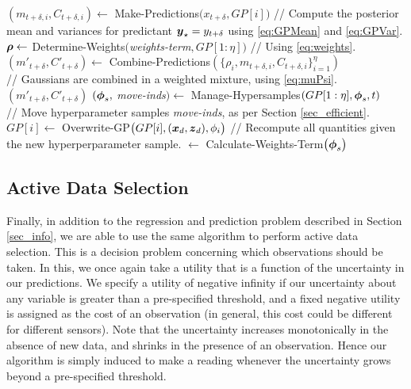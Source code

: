 \documentclass{acmsmall}
\newcommand{\cmmnt}{// }
\begin{document}
\begin{algorithm}[htp]
\begin{algorithmic}[1]
\STATE $(m_{t+\delta,i},C_{t+\delta,i}) \leftarrow$ {\sc Make-Predictions}$\bigl(x_{t+\delta},GP[i]\bigr)$ \cmmnt Compute the posterior mean and variances for predictant $\boldsymbol{y}_\star = y_{t+\delta}$ using \eqref{eq:GPMean} and \eqref{eq:GPVar}.
    \ENDFOR
    \STATE $\boldsymbol{\rho} \leftarrow$ {\sc Determine-Weights}$(${\it weights-term}$,GP[1:\eta])$ \cmmnt Using \eqref{eq:weights}.
    \STATE $(m'_{t+\delta},C'_{t+\delta}) \leftarrow$ {\sc Combine-Predictions}$(\{\rho_i,m_{t+\delta,i},C_{t+\delta,i}\}_{i=1}^{\eta})$ \\\cmmnt Gaussians are combined in a weighted mixture, using \eqref{eq:muPsi}.
     $(m'_{t+\delta},C'_{t+\delta})$
\IF{{\sc Is-Time-To-Move}(t) \cmmnt Infrequently true} 
    \STATE $(\boldsymbol{\phi}_s, $ {\it move-inds}$) \leftarrow$ {\sc Manage-Hypersamples}$( 
GP[1:\eta], \boldsymbol{\phi}_s, t)$\\ \cmmnt Move hyperparameter samples {\it move-inds}, as per Section \ref{sec_efficient}.
\STATE $GP[i] \leftarrow$ {\sc Overwrite-GP}$\bigl(GP[i], (\boldsymbol{x}_d, \boldsymbol{z}_d), \phi_i\bigr)$ \cmmnt Recompute all quantities given the new hyperperparameter sample.
\ENDFOR
{} $ \leftarrow$ {\sc Calculate-Weights-Term}$\bigl(\boldsymbol{\phi}_s\bigr)$
\ENDIF
    \ENDFOR
  \end{algorithmic}
  \label{alg:track}
\end{algorithm}

\subsection{Active Data Selection}\label{active_selection}

\noindent Finally, in addition to the regression and prediction problem described in Section \ref{sec_info}, we are able to use the same algorithm to perform active data selection. This is a decision problem concerning which observations should be taken. In this, we once again take a utility that is a function of the uncertainty in our predictions. We specify a utility of negative infinity if our uncertainty about any variable is greater than a pre-specified threshold, and a fixed negative utility is assigned as the cost of an observation (in general, this cost could be different for different sensors). Note that the uncertainty increases monotonically in the absence of new data, and shrinks in the presence of an observation. Hence our algorithm is simply induced to make a reading whenever the uncertainty grows beyond a pre-specified threshold. 
\end{document}
